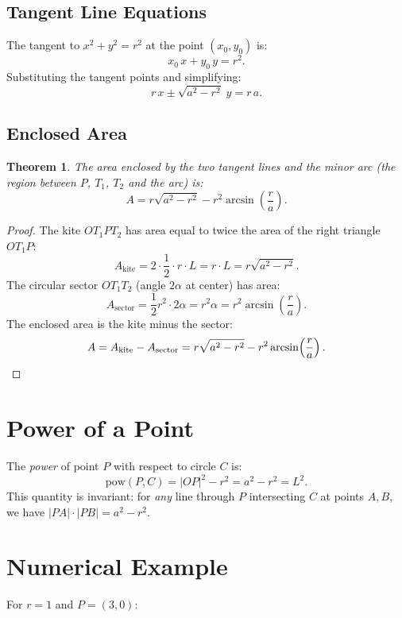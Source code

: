 \documentclass[11pt,a4paper]{article}
\newtheorem{theorem}{Theorem}
\begin{document}
\subsection{Tangent Line Equations}

The tangent to $x^2 + y^2 = r^2$ at the point $(x_0, y_0)$ is:
\[
    x_0\, x + y_0\, y = r^2.
\]
Substituting the tangent points and simplifying:
\[
    r\,x \pm \sqrt{a^2 - r^2}\; y = r\,a.
\]

\subsection{Enclosed Area}

\begin{theorem}
The area enclosed by the two tangent lines and the minor arc (the region between $P$, $T_1$, $T_2$ and the arc) is:
\[
    A = r\sqrt{a^2 - r^2} - r^2 \arcsin\!\left(\frac{r}{a}\right).
\]
\end{theorem}

\begin{proof}
The kite $OT_1PT_2$ has area equal to twice the area of the right triangle $OT_1P$:
\[
    A_{\text{kite}} = 2 \cdot \frac{1}{2} \cdot r \cdot L = r \cdot L = r\sqrt{a^2 - r^2}.
\]
The circular sector $OT_1T_2$ (angle $2\alpha$ at center) has area:
\[
    A_{\text{sector}} = \frac{1}{2} r^2 \cdot 2\alpha = r^2 \alpha = r^2 \arcsin\!\left(\frac{r}{a}\right).
\]
The enclosed area is the kite minus the sector:
\[
    A = A_{\text{kite}} - A_{\text{sector}} = r\sqrt{a^2 - r^2} - r^2 \arcsin\!\left(\frac{r}{a}\right). \qedhere
\]
\end{proof}

\section{Power of a Point}

The \emph{power} of point $P$ with respect to circle $C$ is:
\[
    \text{pow}(P, C) = |OP|^2 - r^2 = a^2 - r^2 = L^2.
\]
This quantity is invariant: for \emph{any} line through $P$ intersecting $C$ at points $A, B$, we have $|PA| \cdot |PB| = a^2 - r^2$.

\section{Numerical Example}

For $r = 1$ and $P = (3, 0)$:
\end{document}
